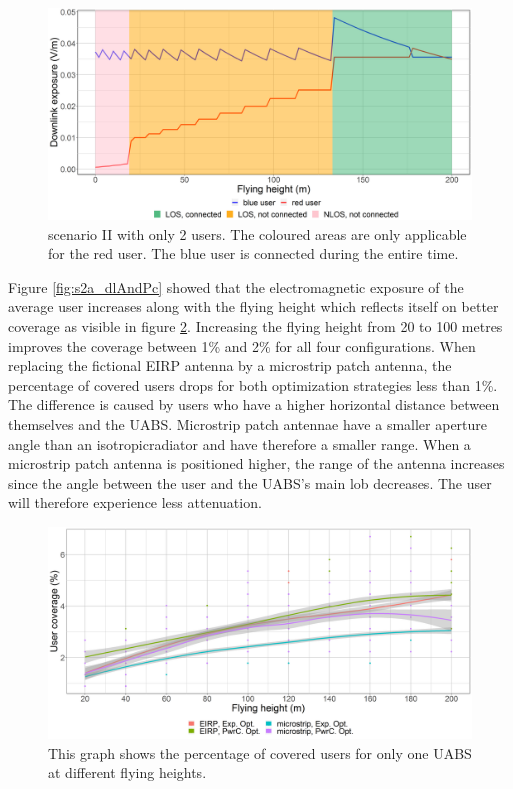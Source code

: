 \begin{figure}[h!]
  \includegraphics[width=\textwidth]{../results/s2/prove.png}
  \caption{scenario II with only 2 users. The coloured areas are only applicable for the red user. 
  The blue user is connected during the entire time.}
  \label{fig:prove}
\end{figure}


Figure \ref{fig:s2a_dlAndPc} showed that the electromagnetic exposure of the average user increases along with the flying height
which reflects itself on better coverage as visible in figure  \ref{fig:s2fhvscov}.
Increasing the flying height from 20 to 100 metres improves the coverage between 1\% and 2\% for all four configurations.
When replacing the fictional \gls{EIRP} antenna by a microstrip patch antenna, the percentage of covered users drops for both 
optimization strategies less than 1\%. 
The difference is caused by users who have a higher horizontal distance between themselves and the \gls{UABS}. Microstrip 
patch antennae have a smaller aperture angle than an \gls{isotropicradiator} and have therefore a smaller range.
When a microstrip patch antenna is positioned higher, the range of the antenna increases 
since the angle between the user and the \gls{UABS}'s main lob decreases. The user will therefore experience less attenuation.

\begin{figure}[h!]
  \includegraphics[width=\textwidth]{../results/s2/fhvscov.png}
  \caption{This graph shows the percentage of covered users for only one \acs{UABS} at different flying heights.}
  \label{fig:s2fhvscov}
\end{figure}

